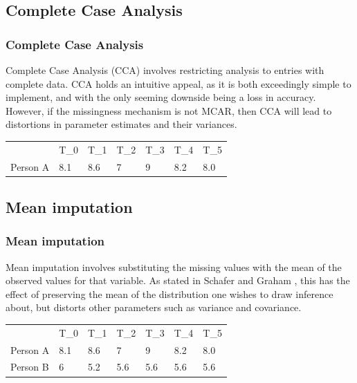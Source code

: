 \documentclass{beamer}
\begin{document}
\subsection{Complete Case Analysis}
\begin{frame}
\frametitle{Complete Case Analysis}
Complete Case Analysis (CCA) involves restricting analysis to entries with complete data. CCA holds an intuitive appeal, as it is both exceedingly simple to implement, and with the only seeming downside being a loss in accuracy. However, if the missingness mechanism is not MCAR, then CCA will lead to distortions in parameter estimates and their variances\cite{Schafer2002}.

\begin{table}[]
	\begin{tabular}{lllllll}
		& T\_0 & T\_1 & T\_2 & T\_3 & T\_4 & T\_5 \\
		Person A & 8.1  & 8.6  & 7    & 9    & 8.2  & 8.0 
	\end{tabular}
\end{table}

\end{frame}


\subsection{Mean imputation}
\begin{frame}
\frametitle{Mean imputation}
Mean imputation involves substituting the missing values with the mean of the observed values for that variable. As stated in Schafer and Graham \cite{Schafer2002}, this has the effect of preserving the mean of the distribution one wishes to draw inference about, but distorts other parameters such as variance and covariance.

\begin{table}[]
	\begin{tabular}{lllllll}
		& T\_0 & T\_1 & T\_2 & T\_3 & T\_4 & T\_5 \\
		Person A & 8.1  & 8.6  & 7    & 9    & 8.2  & 8.0  \\
		Person B & 6    & 5.2  & 5.6   & 5.6   & 5.6   & 5.6  
	\end{tabular}
\end{table}

\end{frame}
\end{document}
